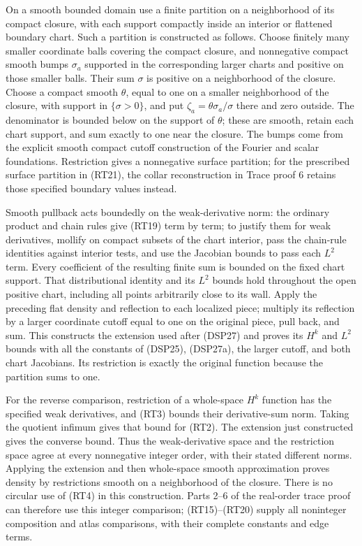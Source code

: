 \documentclass[
  11pt,
]{article}
\begin{document}
On a smooth bounded domain use a finite partition on a neighborhood of
its compact closure, with each support compactly inside an interior or
flattened boundary chart. Such a partition is constructed as follows.
Choose finitely many smaller coordinate balls covering the compact
closure, and nonnegative compact smooth bumps \(\sigma_a\) supported in
the corresponding larger charts and positive on those smaller balls.
Their sum \(\sigma\) is positive on a neighborhood of the closure.
Choose a compact smooth \(\theta\), equal to one on a smaller
neighborhood of the closure, with support in \(\{\sigma>0\}\), and put
\(\zeta_a=\theta\sigma_a/\sigma\) there and zero outside. The
denominator is bounded below on the support of \(\theta\); these are
smooth, retain each chart support, and sum exactly to one near the
closure. The bumps come from the explicit smooth compact cutoff
construction of the Fourier and scalar foundations. Restriction gives a
nonnegative surface partition; for the prescribed surface partition in
(RT21), the collar reconstruction in Trace proof 6 retains those
specified boundary values instead.

Smooth pullback acts boundedly on the weak-derivative norm: the ordinary
product and chain rules give (RT19) term by term; to justify them for
weak derivatives, mollify on compact subsets of the chart interior, pass
the chain-rule identities against interior tests, and use the Jacobian
bounds to pass each \(L^2\) term. Every coefficient of the resulting
finite sum is bounded on the fixed chart support. That distributional
identity and its \(L^2\) bounds hold throughout the open positive chart,
including all points arbitrarily close to its wall. Apply the preceding
flat density and reflection to each localized piece; multiply its
reflection by a larger coordinate cutoff equal to one on the original
piece, pull back, and sum. This constructs the extension used after
(DSP27) and proves its \(H^k\) and \(L^2\) bounds with all the constants
of (DSP25), (DSP27a), the larger cutoff, and both chart Jacobians. Its
restriction is exactly the original function because the partition sums
to one.

For the reverse comparison, restriction of a whole-space \(H^k\)
function has the specified weak derivatives, and (RT3) bounds their
derivative-sum norm. Taking the quotient infimum gives that bound for
(RT2). The extension just constructed gives the converse bound. Thus the
weak-derivative space and the restriction space agree at every
nonnegative integer order, with their stated different norms. Applying
the extension and then whole-space smooth approximation proves density
by restrictions smooth on a neighborhood of the closure. There is no
circular use of (RT4) in this construction. Parts 2--6 of the real-order
trace proof can therefore use this integer comparison; (RT15)--(RT20)
supply all noninteger composition and atlas comparisons, with their
complete constants and edge terms.
\end{document}
